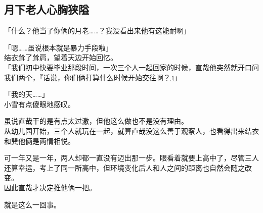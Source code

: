 \subsection{月下老人心胸狭隘}

「什么？他当了你俩的月老……？我没看出来他有这能耐啊」

「嗯……虽说根本就是暴力手段啦」\\

结衣耸了耸肩，望着天边开始回忆。\\

「我们初中快要毕业那段时间，一次三个人一起回家的时候，直哉他突然就开口问我们两个，『话说，你们俩打算什么时候开始交往啊？』」

「我的天……」\\

小雪有点傻眼地感叹。

虽说直哉干的是有点太过激，但他这么做也不是没有理由。\\

从幼儿园开始，三个人就玩在一起，就算直哉没这么善于观察人，也看得出来结衣和巽他俩是两情相悦。

可一年又是一年，两人却都一直没有迈出那一步。眼看着就要上高中了，尽管三人还算幸运，考上了同一所高中，但环境变化后人和人之间的距离也自然会随之改变。\\

因此直哉才决定推他俩一把。

就是这么一回事。\\

